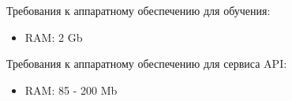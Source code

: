 Требования к аппаратному обеспечению для обучения:
\begin{itemize}
  \item RAM: 2 Gb
\end{itemize}

Требования к аппаратному обеспечению для сервиса API:
\begin{itemize}
  \item RAM: 85 - 200 Mb
\end{itemize}
